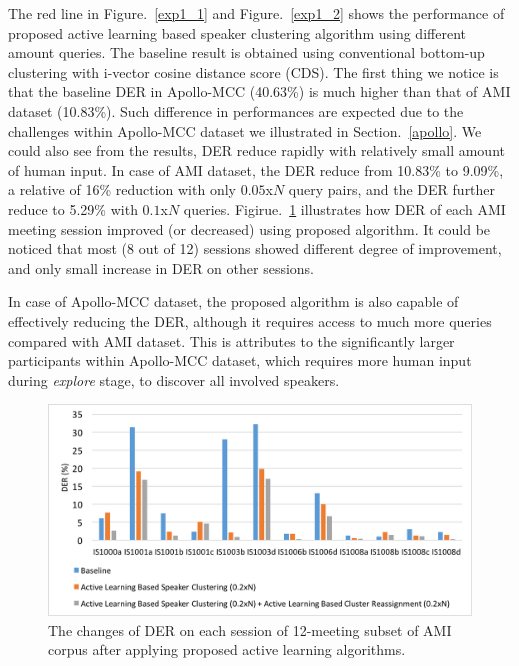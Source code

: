 \documentclass[journal,10pt]{IEEEtran}
\begin{document}
The red line in Figure.~\ref{exp1_1} and Figure.~\ref{exp1_2} shows the performance of proposed active learning based speaker clustering algorithm using different amount queries. The baseline result is obtained using conventional bottom-up clustering with i-vector cosine distance score (CDS). The first thing we notice is that the baseline DER in Apollo-MCC (40.63\%) is much higher than that of AMI dataset (10.83\%). Such difference in performances are expected due to the challenges within Apollo-MCC dataset we illustrated in Section.~\ref{apollo}. We could also see from the results, DER reduce rapidly with relatively small amount of human input. In case of AMI dataset, the DER reduce from 10.83\% to 9.09\%, a relative of 16\% reduction with only $0.05$x$N$ query pairs, and the DER further reduce to 5.29\% with $0.1$x$N$ queries. Figirue.~\ref{exp3_1} illustrates how DER of each AMI meeting session improved (or decreased) using proposed algorithm. It could be noticed that most (8 out of 12) sessions showed different degree of improvement, and only small increase in DER on other sessions.  

In case of Apollo-MCC dataset, the proposed algorithm is also capable of effectively reducing the DER, although it requires access to much more queries compared with AMI dataset. This is attributes to the significantly larger participants within Apollo-MCC dataset, which requires more human input during \textit{explore} stage, to discover all involved speakers. 

\begin{figure}[t]
	\centering
	\includegraphics[width=0.75\linewidth]{figs/exp3_1}
	\caption{The changes of DER on each session of 12-meeting subset of AMI corpus after applying proposed active learning algorithms.}
	\label{exp3_1}
\end{figure}
\end{document}
